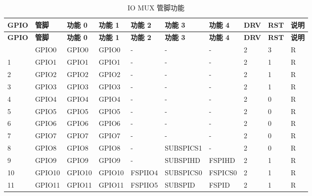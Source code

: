 \begin{longtable}[c]{|l|l|l|l|l|l|l|p{0.5cm}<{\centering}|p{0.5cm}<{\centering}|p{0.8cm}<{\centering}| }
\caption{IO MUX 管脚功能}
    \label{tab:iomuxgpio-pin-functions} \\
        \hline
        \rowcolor{lightgray}
\textbf{GPIO} & \textbf{管脚} & \textbf{功能 0} & \textbf{功能 1} & \textbf{功能 2} & \textbf{功能 3} & \textbf{功能 4} & \textbf{DRV} & \textbf{RST} & \textbf{说明} \\
 \hline
\endfirsthead
        \hline
        \rowcolor{lightgray}
        \textbf{GPIO} & \textbf{管脚} & \textbf{功能 0} & \textbf{功能 1} & \textbf{功能 2} & \textbf{功能 3} & \textbf{功能 4} & \textbf{DRV} & \textbf{RST} & \textbf{说明} \\
        \hline
        \endhead
        \endfoot
0 & GPIO0            & GPIO0         & GPIO0   & -          & -            & -           & 2 & 3 & R \\ \hline
1 & GPIO1            & GPIO1         & GPIO1   & -          & -            & -           & 2 & 1 & R \\ \hline
2 & GPIO2            & GPIO2         & GPIO2   & -          & -            & -           & 2 & 1 & R \\ \hline
3 & GPIO3            & GPIO3         & GPIO3   & -          & -            & -           & 2 & 1 & R \\ \hline
4 & GPIO4            & GPIO4         & GPIO4   & -          & -            & -           & 2 & 0 & R \\ \hline
5 & GPIO5            & GPIO5         & GPIO5   & -          & -            & -           & 2 & 0 & R \\ \hline
6 & GPIO6            & GPIO6         & GPIO6   & -          & -            & -           & 2 & 0 & R \\ \hline
7 & GPIO7            & GPIO7         & GPIO7   & -          & -            & -           & 2 & 0 & R \\ \hline
8 & GPIO8            & GPIO8         & GPIO8   & -          & SUBSPICS1    & -           & 2 & 0 & R \\ \hline
9 & GPIO9            & GPIO9         & GPIO9   & -          & SUBSPIHD     & FSPIHD      & 2 & 1 & R \\ \hline
10 & GPIO10          &  GPIO10       & GPIO10  & FSPIIO4    & SUBSPICS0    & FSPICS0     & 2 & 1 & R \\ \hline
11 & GPIO11          &  GPIO11       & GPIO11  & FSPIIO5    & SUBSPID      & FSPID       & 2 & 1 & R \\ \hline

\end{longtable}
